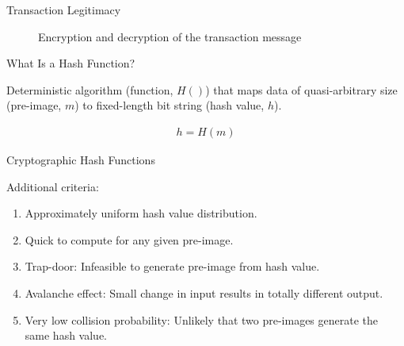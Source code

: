 \documentclass[handout]{beamer}
\begin{document}
\begin{frame}{Transaction Legitimacy}
	\begin{figure}[h!]
		\center
		
		\caption*{Encryption and decryption of the transaction message}
		\label{fig:asymmeinfach}
	\end{figure}
	
\end{frame}



\begin{frame}{What Is a Hash Function?}

Deterministic algorithm (\color{focus}function, $H()$\color{black}) that maps data of quasi-arbitrary size (\color{focus}pre-image, $m$\color{black}) to fixed-length bit string (\color{focus}hash value, $h$\color{black}).

	\begin{align}
		h = H(m)
		\label{eq:hash_function}
	\end{align}

\vspace{1.5em}
	
	
\end{frame}

\begin{frame}{Cryptographic Hash Functions}

Additional criteria:
	\begin{enumerate}
		\item Approximately uniform hash value distribution.
		\item Quick to compute for any given pre-image.
		\item Trap-door: Infeasible to generate pre-image from hash value.
		\item Avalanche effect: Small change in input results in totally different output.
		\item Very low collision probability: Unlikely that two pre-images generate the same hash value.
	\end{enumerate}
	\vspace{1em}

	
\end{frame}
\end{document}
